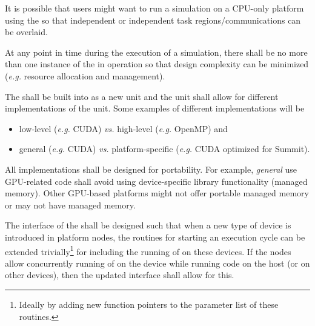 \documentclass{article}
\begin{document}
It is possible that users might want to run a simulation on a CPU-only platform
using the \OR so that independent \taskroutines or independent task regions/communications
can be overlaid.

\begin{req}
At any point in time during the execution of a simulation, there shall be no more
than one instance of the \OR in operation so that design complexity can
be minimized (\textit{e.g.} resource allocation and management).
\end{req}

\begin{req}
\label{req:UnitImplementations}
The \OR shall be built into \FlashOfTheFuture as a new unit and the unit shall allow
for different implementations of the unit.  Some examples of different
implementations will be
\begin{itemize}
\item{low-level (\textit{e.g.} CUDA) \textit{vs.} high-level
(\textit{e.g.} OpenMP) and}
\item{general (\textit{e.g.} CUDA) \textit{vs.}} platform-specific
(\textit{e.g.} CUDA optimized for Summit).
\end{itemize}
\end{req}

\begin{req}
\label{req:Portability}
All implementations shall be designed for portability.  For example,
\textit{general} use GPU-related code shall avoid using device-specific library
functionality (managed memory). Other GPU-based platforms might not
offer portable managed memory or may not have managed memory.
\end{req}


\begin{req}
The interface of the \OR shall be designed such  that when a new type of
device is introduced in platform nodes, the routines for starting an \OR
execution cycle can be extended trivially\footnote{Ideally by adding new function
pointers to the parameter list of these routines.} for including the running of
\taskroutines on these devices.  If the nodes allow concurrently running of \taskroutines on
the device while running code on the host (or on other devices), then the updated
interface shall allow for this.
\end{req}
\end{document}
